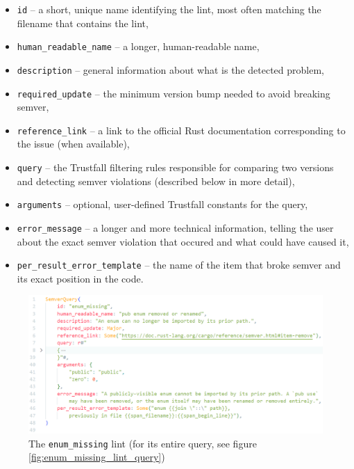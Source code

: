 \documentclass[licencjacka,en]{pracamgr}
\begin{document}
\begin{itemize}
	\item \texttt{id} -- a short, unique name identifying the lint, most often matching the
		filename that contains the lint,
	\item \texttt{human\_readable\_name} -- a longer, human-readable name,
	\item \texttt{description} -- general information about what is the detected problem,
	\item \texttt{required\_update} -- the minimum version bump needed to avoid breaking semver,
	\item \texttt{reference\_link} -- a link to the official Rust documentation corresponding to
		the issue (when available),
	\item \texttt{query} -- the Trustfall filtering rules responsible for comparing two versions and
		detecting semver violations (described below in more detail),
	\item \texttt{arguments} -- optional, user-defined Trustfall constants for the query,
	\item \texttt{error\_message} -- a longer and more technical information, telling the user
	    about the exact semver violation that occured and what could have caused it,
	\item \texttt{per\_result\_error\_template} -- the name of the item that broke semver and
	    its exact position in the code.
\end{itemize}


\begin{figure}[h]
	\centering
	\includegraphics[width=\linewidth]{lint-example.png}
	\caption{The \texttt{enum\_missing} lint (for its entire query, see figure
		\ref{fig:enum_missing_lint_query})}
	\label{fig:enum_missing_lint}
\end{figure}
\end{document}
